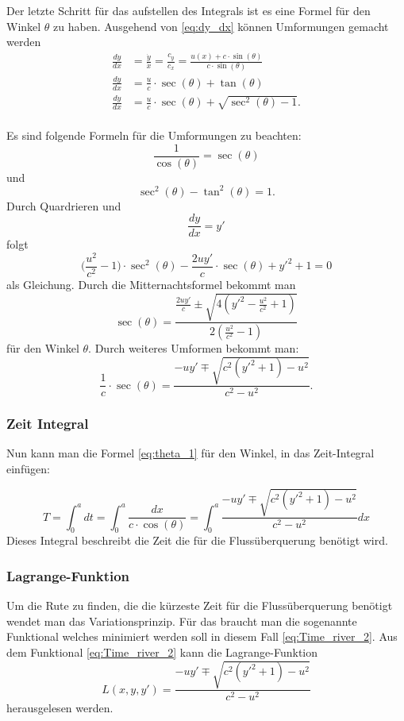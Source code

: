 Der letzte Schritt für das aufstellen des Integrals ist es eine Formel für den Winkel \(\theta\) zu haben.
Ausgehend von \eqref{eq:dy_dx} können Umformungen gemacht werden
\begin{align}
    \frac{dy}{dx} &= \frac{\dot{y}}{\dot{x}} = \frac{c_y}{c_x} = \frac{u(x) + c \cdot \sin(\theta)}{c \cdot \sin(\theta)} \\
    \frac{dy}{dx} &= \frac{u}{c}\cdot \sec(\theta) + \tan(\theta) \\
    \frac{dy}{dx} &= \frac{u}{c}\cdot \sec(\theta) + \sqrt{\sec^2(\theta)-1}. \\
\end{align}

Es sind folgende Formeln für die Umformungen zu beachten: \[\frac{1}{\cos(\theta)} = \sec(\theta)\] und \[\sec^2(\theta)-\tan^2(\theta) = 1.\] Durch Quardrieren und \[\frac{dy}{dx} = y'\] folgt 
\begin{equation}
    \biggl(\frac{u^2}{c^2}-1 \biggr) \cdot \sec^2(\theta) - \frac{2uy'}{c}\cdot \sec(\theta) + y'^2 +1 = 0
\end{equation}
als Gleichung. Durch die Mitternachtsformel bekommt man 
\begin{equation}
    \sec(\theta) = \frac{\frac{2uy'}{c} \pm \sqrt{4(y'^2-\frac{u^2}{c^2} + 1)}}{2(\frac{u^2}{c^2}-1)}
\end{equation}
für den Winkel \(\theta\). Durch weiteres Umformen bekommt man:
\begin{equation}
    \frac{1}{c}\cdot \sec(\theta) = \frac{-uy' \mp \sqrt{c^2(y'^2+1)-u^2}}{c^2-u^2} .\label{eq:theta_1}
\end{equation}


\subsubsection{Zeit Integral}

Nun kann man die Formel \eqref{eq:theta_1} für den Winkel, in das Zeit-Integral einfügen:

\begin{equation}
    T = \int_0^adt = \int_0^a\frac{dx}{c\cdot \cos(\theta)} = \int_0^a \frac{-uy' \mp \sqrt{c^2(y'^2+1)-u^2}}{c^2-u^2} dx
    \label{eq:Time_river_2} 
\end{equation}
Dieses Integral  beschreibt die Zeit die für die Flussüberquerung benötigt wird. 



\subsubsection{Lagrange-Funktion} 
Um die Rute zu finden, die die kürzeste Zeit für die Flussüberquerung benötigt wendet man das Variationsprinzip. Für das braucht man die sogenannte Funktional welches minimiert werden soll in diesem Fall \eqref{eq:Time_river_2}. 
Aus dem Funktional \eqref{eq:Time_river_2} kann die Lagrange-Funktion
\begin{equation}\label{eq:lagrange_integral}
    L(x, y, y') = \frac{-uy' \mp \sqrt{c^2(y'^2+1)-u^2}}{c^2-u^2}
\end{equation}
herausgelesen werden. 

